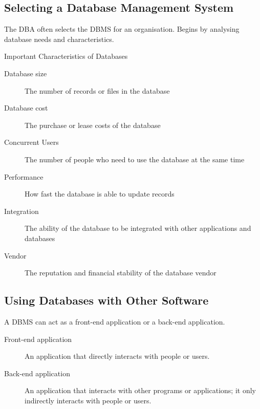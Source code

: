 \documentclass[\main/notes.tex]{subfiles}
\begin{document}
			\subsection{Selecting a Database Management System}
				The DBA often selects the DBMS for an organisation. Begins by analysing database needs and characteristics.
				\begin{sidenote}{Important Characteristics of Databases}
					\begin{description}
						\item[Database size] The number of records or files in the database
						\item[Database cost] The purchase or lease costs of the database
						\item[Concurrent Users] The number of people who need to use the database at the same time
						\item[Performance] How fast the database is able to update records
						\item[Integration] The ability of the database to be integrated with other applications and databases
						\item[Vendor] The reputation and financial stability of the database vendor 
					\end{description}
				\end{sidenote}
			\subsection{Using Databases with Other Software}
				A DBMS can act as a front-end application or a back-end application.
				\begin{indentparagraph}
					\begin{description}
						\item[Front-end application] An application that directly interacts with people or users.
						\item[Back-end application] An application that interacts with other programs or applications; it only indirectly interacts with people or users.
					\end{description}
				\end{indentparagraph}

	\vbox{}
\end{document}
